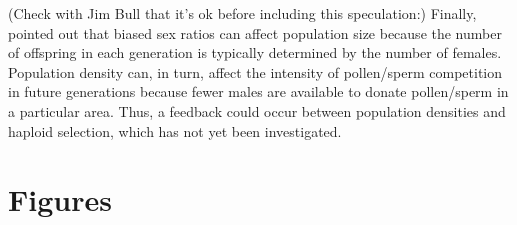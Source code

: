 \documentclass[12pt]{article}
\begin{document}
{\color{blue}
(Check with Jim Bull that it's ok before including this speculation:)
Finally, \citet{Hamilton:1967ts} pointed out that biased sex ratios can affect population size because the number of offspring in each generation is typically determined by the number of females. 
Population density can, in turn, affect the intensity of pollen/sperm competition in future generations because fewer males are available to donate pollen/sperm in a particular area. 
Thus, a feedback could occur between population densities and haploid selection, which has not yet been investigated. 
}




\section*{Figures}
\end{document}
